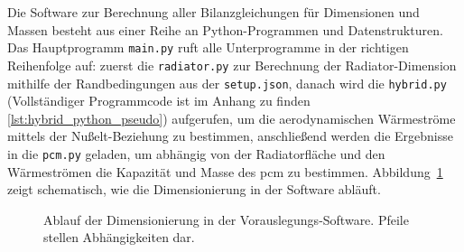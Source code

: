 Die Software zur Berechnung aller Bilanzgleichungen für Dimensionen und Massen besteht aus einer Reihe an Python-Programmen und Datenstrukturen.
Das Hauptprogramm \texttt{main.py} ruft alle Unterprogramme in der richtigen Reihenfolge auf: zuerst die \texttt{radiator.py} zur Berechnung
der Radiator-Dimension mithilfe der Randbedingungen aus der \texttt{setup.json}, danach wird die \texttt{hybrid.py} (Vollständiger Programmcode ist im Anhang zu finden \ref{lst:hybrid_python_pseudo}) aufgerufen, um die aerodynamischen Wärmeströme
mittels der Nußelt-Beziehung zu bestimmen, anschließend werden die Ergebnisse in die \texttt{pcm.py} geladen, um abhängig von der Radiatorfläche
und den Wärmeströmen die Kapazität und Masse des \ac{pcm} zu bestimmen.
Abbildung~\ref{fig:dimensionierung_ablauf} zeigt schematisch, wie die Dimensionierung in der Software abläuft.

\begin{figure}
  \centering
  \caption{Ablauf der Dimensionierung in der Vorauslegungs-Software. Pfeile stellen Abhängigkeiten dar.}\label{fig:dimensionierung_ablauf}
\end{figure}

